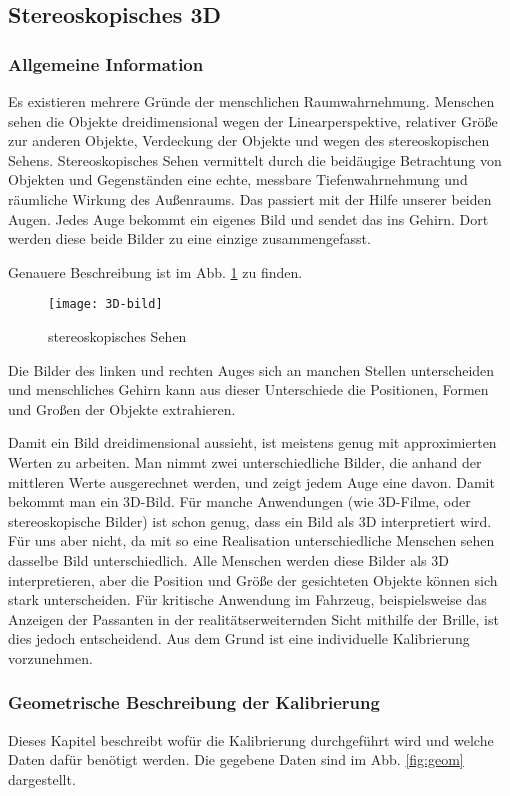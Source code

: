 \subsection{Stereoskopisches 3D}
\label{sec:Stereoskopisches 3D}
\subsubsection{Allgemeine Information}
Es existieren mehrere Gründe der menschlichen Raumwahrnehmung.
Menschen sehen die Objekte dreidimensional wegen der Linearperspektive, relativer Größe zur anderen Objekte, Verdeckung der Objekte und wegen des stereoskopischen Sehens. 
Stereoskopisches Sehen vermittelt durch die beidäugige Betrachtung von Objekten und Gegenständen eine echte, messbare Tiefenwahrnehmung und räumliche Wirkung des Außenraums. 
Das passiert mit der Hilfe unserer beiden Augen.
Jedes Auge bekommt ein eigenes Bild und sendet das ins Gehirn. 
Dort werden diese beide Bilder zu eine einzige zusammengefasst.

Genauere Beschreibung ist im Abb. \ref{fig:3D} zu finden.

\begin{figure}[h]
   \centering
   \texttt{[image: 3D-bild]}
   \caption{stereoskopisches Sehen}
   \label{fig:3D}
\end{figure}

Die Bilder des linken und rechten Auges sich an manchen Stellen unterscheiden und menschliches Gehirn kann aus dieser Unterschiede die Positionen, Formen und Großen der Objekte extrahieren.

Damit ein Bild dreidimensional aussieht, ist meistens genug mit approximierten Werten zu arbeiten.
Man nimmt zwei unterschiedliche Bilder, die anhand der mittleren Werte ausgerechnet werden, und zeigt jedem Auge eine davon. 
Damit bekommt man ein 3D-Bild. 
Für manche Anwendungen (wie 3D-Filme, oder stereoskopische Bilder) ist schon genug,  dass ein Bild als 3D interpretiert wird. 
Für uns aber nicht, da mit so eine Realisation unterschiedliche Menschen sehen dasselbe Bild unterschiedlich.
Alle Menschen werden diese Bilder als 3D interpretieren, aber die Position und Größe der gesichteten Objekte können sich stark unterscheiden. Für kritische Anwendung im Fahrzeug, beispielsweise das Anzeigen der Passanten in der realitätserweiternden Sicht mithilfe der Brille, ist dies jedoch entscheidend. Aus dem Grund ist eine individuelle Kalibrierung vorzunehmen.


\subsubsection{Geometrische Beschreibung der Kalibrierung}
Dieses Kapitel beschreibt wofür die Kalibrierung durchgeführt wird und welche Daten dafür benötigt werden.
Die gegebene Daten sind im Abb. \ref{fig:geom} dargestellt. 

